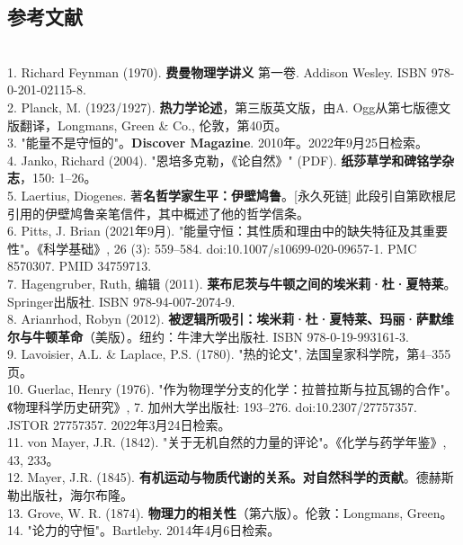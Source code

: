 \subsection{参考文献}\\
1. Richard Feynman (1970). \textbf{费曼物理学讲义} 第一卷. Addison Wesley. ISBN 978-0-201-02115-8.\\
2. Planck, M. (1923/1927). \textbf{热力学论述}，第三版英文版，由A. Ogg从第七版德文版翻译，Longmans, Green & Co., 伦敦，第40页。\\
3. "能量不是守恒的"。\textbf{Discover Magazine}. 2010年。2022年9月25日检索。\\
4. Janko, Richard (2004). "恩培多克勒，《论自然》" (PDF). \textbf{纸莎草学和碑铭学杂志}，150: 1–26。\\
5. Laertius, Diogenes. 著\textbf{名哲学家生平：伊壁鸠鲁}。[永久死链] 此段引自第欧根尼引用的伊壁鸠鲁亲笔信件，其中概述了他的哲学信条。\\
6. Pitts, J. Brian (2021年9月). "能量守恒：其性质和理由中的缺失特征及其重要性"。《科学基础》, 26 (3): 559–584. doi:10.1007/s10699-020-09657-1. PMC 8570307. PMID 34759713.\\
7. Hagengruber, Ruth, 编辑 (2011). \textbf{莱布尼茨与牛顿之间的埃米莉·杜·夏特莱}。\\Springer出版社. ISBN 978-94-007-2074-9.\\
8. Arianrhod, Robyn (2012). \textbf{被逻辑所吸引：埃米莉·杜·夏特莱、玛丽·萨默维尔与牛顿革命}（美版）。纽约：牛津大学出版社. ISBN 978-0-19-993161-3.\\
9. Lavoisier, A.L. & Laplace, P.S. (1780). "热的论文", 法国皇家科学院，第4–355页。\\
10. Guerlac, Henry (1976). "作为物理学分支的化学：拉普拉斯与拉瓦锡的合作"。《物理科学历史研究》, 7. 加州大学出版社: 193–276. doi:10.2307/27757357. JSTOR 27757357. 2022年3月24日检索。\\
11. von Mayer, J.R. (1842). "关于无机自然的力量的评论"。《化学与药学年鉴》, 43, 233。\\
12. Mayer, J.R. (1845). \textbf{有机运动与物质代谢的关系。对自然科学的贡献}。德赫斯勒出版社，海尔布隆。\\
13. Grove, W. R. (1874). \textbf{物理力的相关性}（第六版）。伦敦：Longmans, Green。\\
14. "论力的守恒"。Bartleby. 2014年4月6日检索。\\